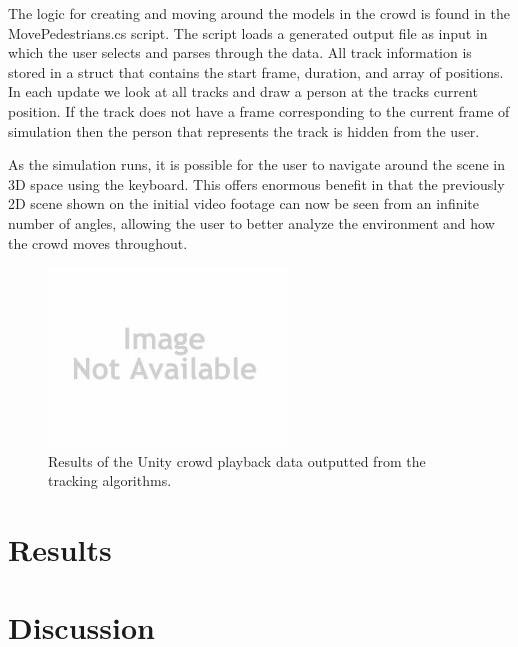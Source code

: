 \documentclass[12pt, twocolumn, conference]{IEEEtran}
\begin{document}
The logic for creating and moving around the models in the crowd is found in the MovePedestrians.cs script. The script loads a generated output file as input in which the user selects and parses through the data. All track information is stored in a struct that contains the start frame, duration, and array of positions. In each update we look at all tracks and draw a person at the tracks current position. If the track does not have a frame corresponding to the current frame of simulation then the person that represents the track is hidden from the user. 

As the simulation runs, it is possible for the user to navigate around the scene in 3D space using the keyboard. This offers enormous benefit in that the previously 2D scene shown on the initial video footage can now be seen from an infinite number of angles, allowing the user to better analyze the environment and how the crowd moves throughout. 

\begin{figure}[!t]
\centering
\includegraphics[width=2.5in]{noImage.jpg}
\caption{Results of the Unity crowd playback data outputted from the tracking algorithms.}
\label{Unity}
\end{figure}

\section{Results}

\section{Discussion}
\end{document}
